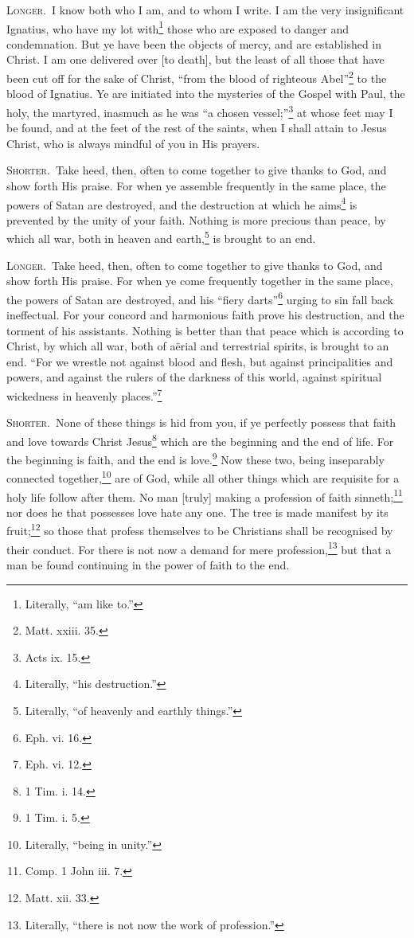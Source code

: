 \textsc{Longer.}~I know both who I am, and to whom I write. I am the very insignificant Ignatius, who have my lot with\footnote{Literally, “am like to.”} those who are exposed to danger and condemnation. But ye have been the objects of mercy, and are established in Christ. I am one delivered over [to death], but the least of all those that have been cut off for the sake of Christ, “from the blood of righteous Abel”\footnote{Matt. xxiii. 35.} to the blood of Ignatius. Ye are initiated into the mysteries of the Gospel with Paul, the holy, the martyred, inasmuch as he was “a chosen vessel;”\footnote{Acts ix. 15.} at whose feet may I be found, and at the feet of the rest of the saints, when I shall attain to Jesus Christ, who is always mindful of you in His prayers.


\textsc{Shorter.}~Take heed, then, often to come together to give thanks to God, and show forth His praise. For when ye assemble frequently in the same place, the powers of Satan are destroyed, and the destruction at which he aims\footnote{Literally, “his destruction.”} is prevented by the unity of your faith. Nothing is more precious than peace, by which all war, both in heaven and earth,\footnote{Literally, “of heavenly and earthly things.”} is brought to an end.

\textsc{Longer.}~Take heed, then, often to come together to give thanks to God, and show forth His praise. For when ye come frequently together in the same place, the powers of Satan are destroyed, and his “fiery darts”\footnote{Eph. vi. 16.} urging to sin fall back ineffectual. For your concord and harmonious faith prove his destruction, and the torment of his assistants. Nothing is better than that peace which is according to Christ, by which all war, both of aërial and terrestrial spirits, is brought to an end. “For we wrestle not against blood and flesh, but against principalities and powers, and against the rulers of the darkness of this world, against spiritual wickedness in heavenly places.”\footnote{Eph. vi. 12.}


\textsc{Shorter.}~None of these things is hid from you, if ye perfectly possess that faith and love towards Christ Jesus\footnote{1 Tim. i. 14.} which are the beginning and the end of life. For the beginning is faith, and the end is love.\footnote{1 Tim. i. 5.} Now these two, being inseparably connected together,\footnote{Literally, “being in unity.”} are of God, while all other things which are requisite for a holy life follow after them. No man [truly] making a profession of faith sinneth;\footnote{Comp. 1 John iii. 7.} nor does he that possesses love hate any one. The tree is made manifest by its fruit;\footnote{Matt. xii. 33.} so those that profess themselves to be Christians shall be recognised by their conduct. For there is not now a demand for mere profession,\footnote{Literally, “there is not now the work of profession.”} but that a man be found continuing in the power of faith to the end.

